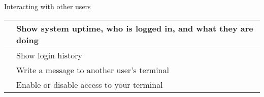 \begin{block}{Interacting with other users}
  \begin{tabu} to 0.9\linewidth { X X[4] }
     & Show system uptime, who is logged in, and what they are doing \\ \hline
     & Show login history \\ \hline
     & Write a message to another user's terminal \\ \hline
     & Enable or disable  access to your terminal
  \end{tabu}
\end{block}

